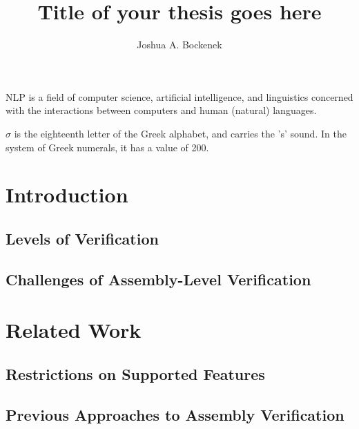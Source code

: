 \documentclass[draft,nopageskip,prelim]{VTthesis} %
\title{Title of your thesis goes here}
\author{Joshua A. Bockenek}
\begin{document}
  \frontmatter
  \maketitle
  \tableofcontents

	\listoffigures
	\listoftables
  \printnomenclature %

NLP is a field of computer science, artificial intelligence, and linguistics concerned with the interactions between computers and human (natural) languages.


$\sigma$ is the eighteenth letter of the Greek alphabet, and carries the 's' sound. In the system of Greek numerals, it has a value of 200.


	\mainmatter

  \chapter{Introduction}
  \section{Levels of Verification}
  \section{Challenges of Assembly-Level Verification}

  \chapter{Related Work}
  \section{Restrictions on Supported Features}
  \section{Previous Approaches to Assembly Verification}
\end{document}
